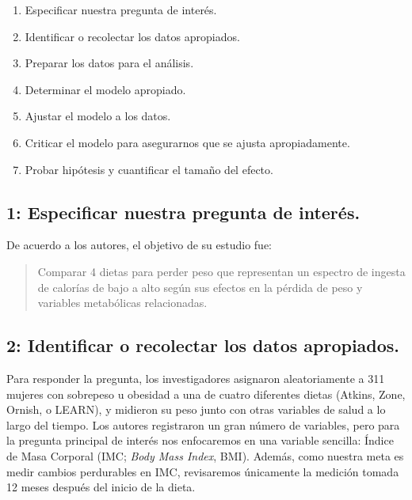 \documentclass[
  12pt,
]{book}
\providecommand{\tightlist}{%
  \setlength{\itemsep}{0pt}\setlength{\parskip}{0pt}}
\begin{document}
\begin{enumerate}
\def\labelenumi{\arabic{enumi}.}
\tightlist
\item
  Especificar nuestra pregunta de interés.
\item
  Identificar o recolectar los datos apropiados.
\item
  Preparar los datos para el análisis.
\item
  Determinar el modelo apropiado.
\item
  Ajustar el modelo a los datos.
\item
  Criticar el modelo para asegurarnos que se ajusta apropiadamente.
\item
  Probar hipótesis y cuantificar el tamaño del efecto.
\end{enumerate}

\hypertarget{especificar-nuestra-pregunta-de-interuxe9s.}{%
\subsection{1: Especificar nuestra pregunta de interés.}\label{especificar-nuestra-pregunta-de-interuxe9s.}}

De acuerdo a los autores, el objetivo de su estudio fue:

\begin{quote}
Comparar 4 dietas para perder peso que representan un espectro de ingesta de calorías de bajo a alto según sus efectos en la pérdida de peso y variables metabólicas relacionadas.
\end{quote}

\hypertarget{identificar-o-recolectar-los-datos-apropiados.}{%
\subsection{2: Identificar o recolectar los datos apropiados.}\label{identificar-o-recolectar-los-datos-apropiados.}}

Para responder la pregunta, los investigadores asignaron aleatoriamente a 311 mujeres con sobrepeso u obesidad a una de cuatro diferentes dietas (Atkins, Zone, Ornish, o LEARN), y midieron su peso junto con otras variables de salud a lo largo del tiempo. Los autores registraron un gran número de variables, pero para la pregunta principal de interés nos enfocaremos en una variable sencilla: Índice de Masa Corporal (IMC; \emph{Body Mass Index}, BMI). Además, como nuestra meta es medir cambios perdurables en IMC, revisaremos únicamente la medición tomada 12 meses después del inicio de la dieta.
\end{document}
